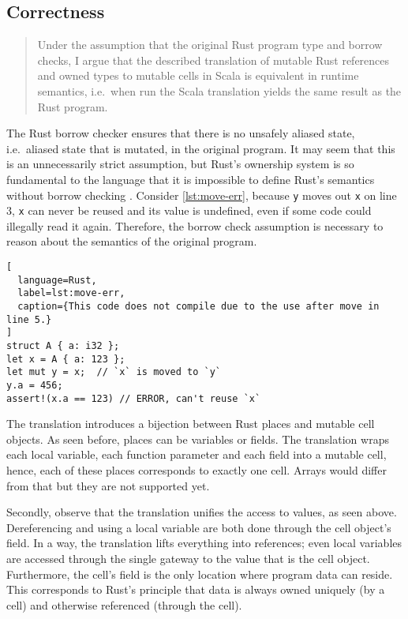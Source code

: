 \subsection{Correctness}
\label{correctness-claim}

\begin{quote}
Under the assumption that the original Rust program type and borrow
checks, I argue that the described translation of mutable Rust
references and owned types to mutable cells in Scala is equivalent in
runtime semantics, i.e.~when run the Scala translation yields the same
result as the Rust program.
\end{quote}

The Rust borrow checker ensures that there is no unsafely aliased state,
i.e.~aliased state that is mutated, in the original program. It may seem that
this is an unnecessarily strict assumption, but Rust's ownership system is so
fundamental to the language that it is impossible to define Rust's semantics
without borrow checking \cite{krust}. Consider \autoref{lst:move-err}, because
\lstinline!y! moves out \lstinline!x! on line 3, \lstinline!x! can never be
reused and its value is undefined, even if some code could illegally read it
again. Therefore, the borrow check assumption is necessary to reason about the
semantics of the original program.

\begin{lstlisting}[
  language=Rust,
  label=lst:move-err,
  caption={This code does not compile due to the use after move in line 5.}
]
struct A { a: i32 };
let x = A { a: 123 };
let mut y = x;  // `x` is moved to `y`
y.a = 456;
assert!(x.a == 123) // ERROR, can't reuse `x`
\end{lstlisting}

The translation introduces a bijection between Rust places and mutable cell
objects. As seen before, places can be variables or fields. The translation
wraps each local variable, each function parameter and each field into a mutable
cell, hence, each of these places corresponds to exactly one cell. Arrays would
differ from that but they are not supported yet.

Secondly, observe that the translation unifies the access to values, as seen
above. Dereferencing and using a local variable are both done through the cell
object's field. In a way, the translation lifts everything into references; even
local variables are accessed through the single gateway to the value that is the
cell object. Furthermore, the cell's field is the only location where program
data can reside. This corresponds to Rust's principle that data is always owned
uniquely (by a cell) and otherwise referenced (through the cell).

